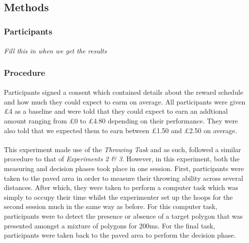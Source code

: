 \documentclass[12pt]{article}
\begin{document}
\subsection*{Methods}
\subsubsection*{Participants}
\paragraph{} \textit{Fill this in when we get the results}

\subsubsection*{Procedure} 
\paragraph{} Participants signed a consent which contained details about the reward schedule and how much they could expect to earm on average. All participants were given £4 as a baseline and were told that they could expect to earn an addtional amount ranging from £0 to £4.80 depending on their performance. They were also told that we expected them to earn between £1.50 and £2.50 on average.  

\paragraph{} This experiment made use of the \textit{Throwing Task} and as such, followed a similar procedure to that of \textit{Experiments 2 \& 3}. However, in this experiment, both the measuring and decision phases took place in one session. First, participants were taken to the paved area in order to measure their throwing ability across several distances. After which, they were taken to perform a computer task which was simply to occupy their time whilst the experimenter set up the hoops for the second session much in the same way as before. For this computer task, participants were to detect the presence or absence of a target polygon that was presented amongst a mixture of polygons for 200ms. For the final task, participants were taken back to the paved area to perform the decision phase. 
\end{document}
